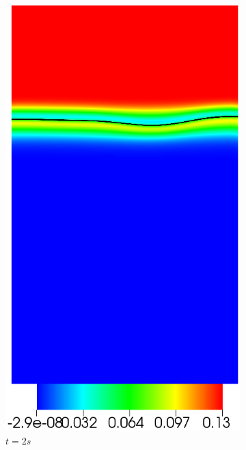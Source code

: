 \begin{figure}[H]
\begin{subfigure}[ht!]{0.2\textwidth}
		\includegraphics[width=1\textwidth]{figure/PT_RT/concent0/visit0008.png}
		\caption{$t=2s$}
	\end{subfigure}
	\begin{subfigure}[ht!]{0.2\textwidth}
		\centering

\end{subfigure}
\end{figure}
